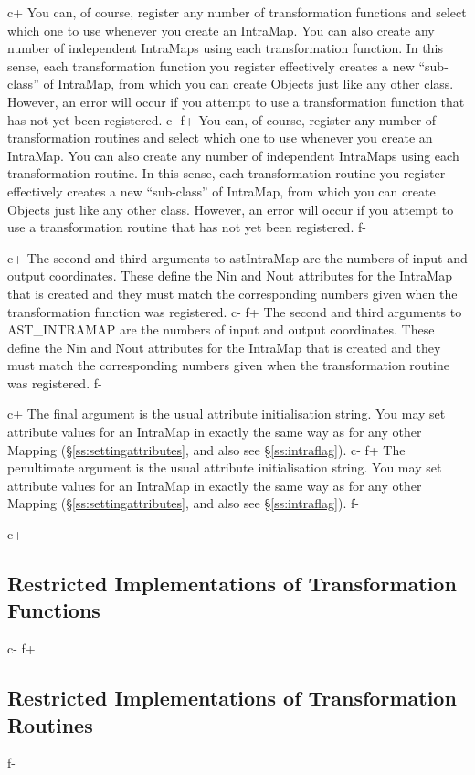 \documentclass[twoside,11pt]{article}
\newcommand{\secref}[1]{\S\ref{#1}}
\newcommand{\secref}[1]{\ref{#1}}
\begin{document}
c+
You can, of course, register any number of transformation functions
and select which one to use whenever you create an IntraMap. You can
also create any number of independent IntraMaps using each
transformation function. In this sense, each transformation function
you register effectively creates a new ``sub-class'' of IntraMap, from
which you can create Objects just like any other class. However, an
error will occur if you attempt to use a transformation function that
has not yet been registered.
c-
f+
You can, of course, register any number of transformation routines and
select which one to use whenever you create an IntraMap. You can also
create any number of independent IntraMaps using each transformation
routine. In this sense, each transformation routine you register
effectively creates a new ``sub-class'' of IntraMap, from which you
can create Objects just like any other class. However, an error will
occur if you attempt to use a transformation routine that has not yet
been registered.
f-

c+
The second and third arguments to astIntraMap are the numbers of input
and output coordinates. These define the Nin and Nout attributes for
the IntraMap that is created and they must match the corresponding
numbers given when the transformation function was registered.
c-
f+
The second and third arguments to AST\_INTRAMAP are the numbers of
input and output coordinates. These define the Nin and Nout attributes
for the IntraMap that is created and they must match the corresponding
numbers given when the transformation routine was registered.
f-

c+
The final argument is the usual attribute initialisation string. You
may set attribute values for an IntraMap in exactly the same way as
for any other Mapping (\secref{ss:settingattributes}, and also see
\secref{ss:intraflag}).
c-
f+
The penultimate argument is the usual attribute initialisation
string. You may set attribute values for an IntraMap in exactly the
same way as for any other Mapping (\secref{ss:settingattributes}, and
also see \secref{ss:intraflag}).
f-

c+
\subsection{\label{ss:restrictedintramaps}Restricted Implementations of Transformation Functions}
c-
f+
\subsection{\label{ss:restrictedintramaps}Restricted Implementations of Transformation Routines}
f-
\end{document}
